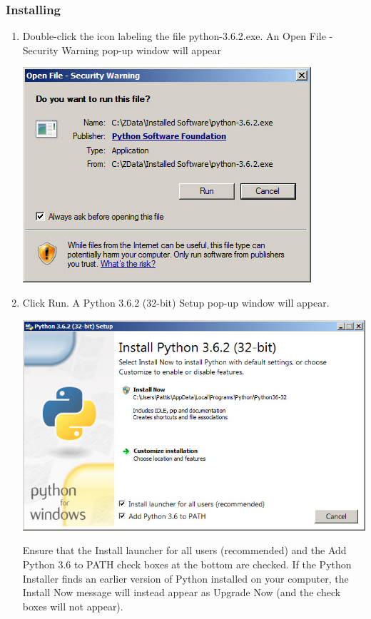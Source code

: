 \documentclass[11pt]{article}
\begin{document}
\begin{multicols}{2}
\subsubsection{Installing}
\begin{enumerate}
\item Double-click the icon labeling the file python-3.6.2.exe.
An Open File - Security Warning pop-up window will appear
\begin{center}
\includegraphics[scale=0.70]{3.jpg} \\ 
\end{center}
\item Click Run.
A Python 3.6.2 (32-bit) Setup pop-up window will appear.
\begin{center}
\includegraphics[scale=0.43]{4.jpg} \\ 
\end{center}
Ensure that the Install launcher for all users (recommended) and the Add Python 3.6 to PATH check boxes at the bottom are checked.
If the Python Installer finds an earlier version of Python installed on your computer, the Install Now message will instead appear as Upgrade Now (and the check boxes will not appear).

\end{enumerate}
\end{multicols}
\end{document}
